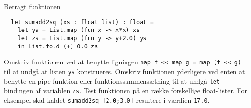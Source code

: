 Betragt funktionen
\begin{lstlisting}
  let sumadd2sq (xs : float list) : float =
    let ys = List.map (fun x -> x*x) xs
    let zs = List.map (fun y -> y+2.0) ys
    in List.fold (+) 0.0 zs
\end{lstlisting}
Omskriv funktionen ved at benytte ligningen
\lstinline{map f << map g = map (f << g)} til at undgå at listen \lstinline{ys} konstrueres.
%
Omskriv funktionen yderligere ved enten at benytte en pipe-funktion
eller funktionssammensætning til at undgå \lstinline{let}-bindingen af
variablen \lstinline{zs}.
%
Test funktionen på en række forskellige float-lister. For eksempel
skal kaldet \lstinline{sumadd2sq [2.0;3.0]} resultere i
værdien \lstinline{17.0}.
